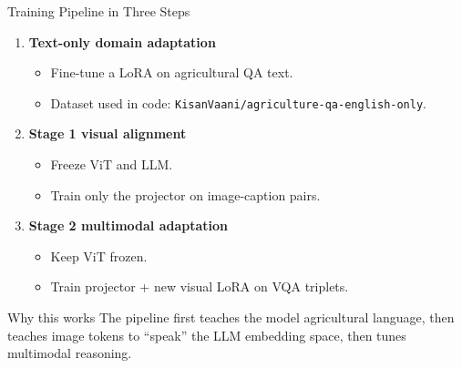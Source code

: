 \documentclass[aspectratio=169,11pt]{beamer}
\begin{document}
\begin{frame}{Training Pipeline in Three Steps}
\begin{enumerate}
    \item \textbf{Text-only domain adaptation}
    \begin{itemize}
        \item Fine-tune a LoRA on agricultural QA text.
        \item Dataset used in code: \texttt{KisanVaani/agriculture-qa-english-only}.
    \end{itemize}
    \item \textbf{Stage 1 visual alignment}
    \begin{itemize}
        \item Freeze ViT and LLM.
        \item Train only the projector on image-caption pairs.
    \end{itemize}
    \item \textbf{Stage 2 multimodal adaptation}
    \begin{itemize}
        \item Keep ViT frozen.
        \item Train projector + new visual LoRA on VQA triplets.
    \end{itemize}
\end{enumerate}
\vspace{0.4em}
\begin{block}{Why this works}
The pipeline first teaches the model agricultural language, then teaches image tokens to ``speak'' the LLM embedding space, then tunes multimodal reasoning.
\end{block}
\end{frame}
\end{document}
